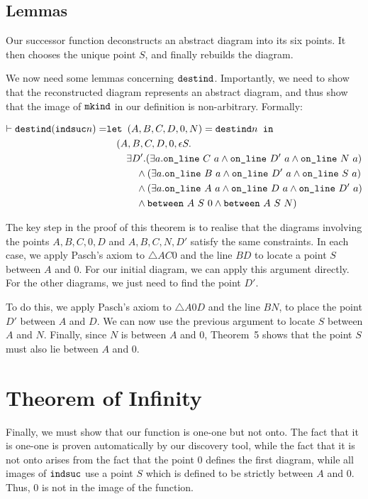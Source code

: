 \subsection{Lemmas}
Our successor function deconstructs an abstract diagram into its six points. It then chooses the unique point $S$, and finally rebuilds the diagram. 

We now need some lemmas concerning $\texttt{destind}$. Importantly, we need to show that the reconstructed diagram represents an abstract diagram, and thus show that the image of $\texttt{mkind}$ in our definition is non-arbitrary. Formally:

\begin{align*}
\vdash \texttt{destind} (\texttt{indsuc} n) = & \texttt{let } (A,B,C,D,0,N) = \texttt{destind} n \texttt{ in}\\
&\quad (A,B,C,D,0,\epsilon S.\\
&\quad\quad \exists D'. (\exists a. \texttt{on\_line}\ C\ a \wedge \texttt{on\_line}\ D'\ a \wedge \texttt{on\_line}\ N\ a)\\
&\qquad\quad \wedge (\exists a. \texttt{on\_line}\ B\ a \wedge \texttt{on\_line}\ D'\ a \wedge \texttt{on\_line}\ S\ a)\\
&\qquad\quad \wedge (\exists a. \texttt{on\_line}\ A\ a \wedge \texttt{on\_line}\ D\ a \wedge \texttt{on\_line}\ D'\ a)\\
&\qquad\quad \wedge \texttt{between}\ A\ S\ 0 \wedge \texttt{between}\ A\ S\ N)
\end{align*} 

The key step in the proof of this theorem is to realise that the diagrams involving the points $A,B,C,0,D$ and $A,B,C,N,D'$ satisfy the same constraints. In each case, we apply Pasch's axiom to $\triangle AC0$ and the line $BD$ to locate a point $S$ between $A$ and $0$. For our initial diagram, we can apply this argument directly. For the other diagrams, we just need to find the point $D'$.

To do this, we apply Pasch's axiom to $\triangle A0D$ and the line $BN$, to place the point $D'$ between $A$ and $D$. We can now use the previous argument to locate $S$ between $A$ and $N$. Finally, since $N$ is between $A$ and $0$, Theorem~5 shows that the point $S$ must also lie between $A$ and $0$. 

\section{Theorem of Infinity}
Finally, we must show that our function is one-one but not onto. The fact that it is one-one is proven automatically by our discovery tool, while the fact that it is not onto arises from the fact that the point $0$ defines the first diagram, while all images of $\texttt{indsuc}$ use a point $S$ which is defined to be strictly between $A$ and $0$. Thus, $0$ is not in the image of the function.

